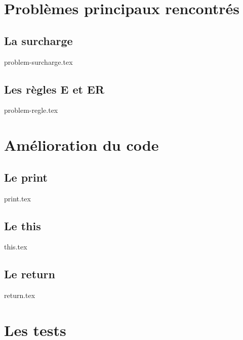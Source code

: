 \documentclass[12pt]{article}
\begin{document}
\section{Problèmes principaux rencontrés}
 	\subsection{La surcharge}
		{problem-surcharge.tex}
	\subsection{Les règles E et ER}
		{problem-regle.tex}
\newpage
\section{Amélioration du code}

	\subsection{Le print}
		{print.tex}

	\subsection{Le this}
		{this.tex}
	\subsection{Le return}
		{return.tex}
\newpage
\section{Les tests}
\end{document}
